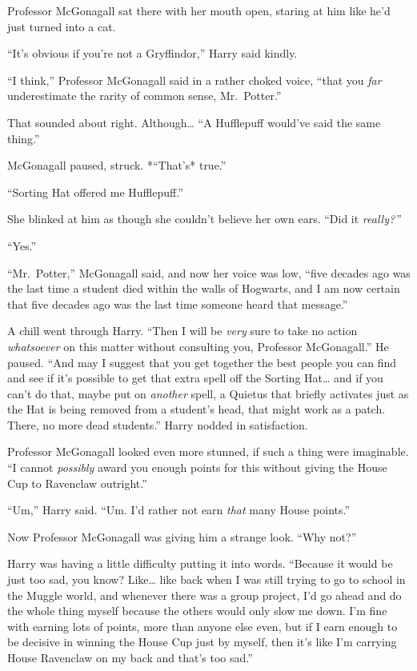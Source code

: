 Professor McGonagall sat there with her mouth open, staring at him like
he'd just turned into a cat.

``It's obvious if you're not a Gryffindor,'' Harry said kindly.

``I think,'' Professor McGonagall said in a rather choked voice, ``that
you \emph{far} underestimate the rarity of common sense, Mr.~Potter.''

That sounded about right. Although\ldots{} ``A Hufflepuff would've said
the same thing.''

McGonagall paused, struck. *``That's* true.''

``Sorting Hat offered me Hufflepuff.''

She blinked at him as though she couldn't believe her own ears. ``Did it
\emph{really?''}

``Yes.''

``Mr.~Potter,'' McGonagall said, and now her voice was low, ``five
decades ago was the last time a student died within the walls of
Hogwarts, and I am now certain that five decades ago was the last time
someone heard that message.''

A chill went through Harry. ``Then I will be \emph{very} sure to take no
action \emph{whatsoever} on this matter without consulting you,
Professor McGonagall.'' He paused. ``And may I suggest that you get
together the best people you can find and see if it's possible to get
that extra spell off the Sorting Hat\ldots{} and if you can't do that,
maybe put on \emph{another} spell, a Quietus that briefly activates just
as the Hat is being removed from a student's head, that might work as a
patch. There, no more dead students.'' Harry nodded in satisfaction.

Professor McGonagall looked even more stunned, if such a thing were
imaginable. ``I cannot \emph{possibly} award you enough points for this
without giving the House Cup to Ravenclaw outright.''

``Um,'' Harry said. ``Um. I'd rather not earn \emph{that} many House
points.''

Now Professor McGonagall was giving him a strange look. ``Why not?''

Harry was having a little difficulty putting it into words. ``Because it
would be just too sad, you know? Like\ldots{} like back when I was still
trying to go to school in the Muggle world, and whenever there was a
group project, I'd go ahead and do the whole thing myself because the
others would only slow me down. I'm fine with earning lots of points,
more than anyone else even, but if I earn enough to be decisive in
winning the House Cup just by myself, then it's like I'm carrying House
Ravenclaw on my back and that's too sad.''

